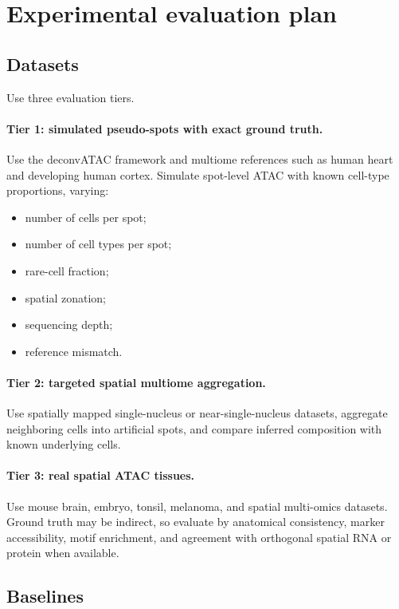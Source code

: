 \documentclass[11pt]{article}
\begin{document}
\section{Experimental evaluation plan}

\subsection{Datasets}

Use three evaluation tiers.

\paragraph{Tier 1: simulated pseudo-spots with exact ground truth.}
Use the deconvATAC framework and multiome references such as human heart and developing human cortex. Simulate spot-level ATAC with known cell-type proportions, varying:
\begin{itemize}
    \item number of cells per spot;
    \item number of cell types per spot;
    \item rare-cell fraction;
    \item spatial zonation;
    \item sequencing depth;
    \item reference mismatch.
\end{itemize}

\paragraph{Tier 2: targeted spatial multiome aggregation.}
Use spatially mapped single-nucleus or near-single-nucleus datasets, aggregate neighboring cells into artificial spots, and compare inferred composition with known underlying cells.

\paragraph{Tier 3: real spatial ATAC tissues.}
Use mouse brain, embryo, tonsil, melanoma, and spatial multi-omics datasets. Ground truth may be indirect, so evaluate by anatomical consistency, marker accessibility, motif enrichment, and agreement with orthogonal spatial RNA or protein when available.

\subsection{Baselines}
\end{document}
